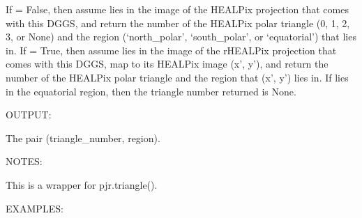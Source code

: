 \documentclass[a4paper,12ptopenany,oneside,english]{sphinxmanual}
\begin{document}
\begin{fulllineitems}
\begin{fulllineitems}
\label{\detokenize{dggs:rhealpixdggs.dggs.RHEALPixDGGS.triangle}}
\pysigstartsignatures
\pysiglinewithargsret
{}
{\sphinxparamcomma {}\sphinxparamcomma {}}
{}
\pysigstopsignatures
\sphinxAtStartPar
If  = False, then assume  lies in the image of the
HEALPix projection that comes with this DGGS, and
return the number of the HEALPix polar triangle (0, 1, 2, 3, or None)
and the region (‘north\_polar’, ‘south\_polar’, or ‘equatorial’) that
 lies in.
If  = True, then assume  lies in the image of
the rHEALPix projection that comes with this DGGS, map 
to its HEALPix image (x’, y’), and return the number of the HEALPix
polar triangle and the region that (x’, y’) lies in.
If  lies in the equatorial region, then the triangle number
returned is None.

\sphinxAtStartPar
OUTPUT:

\sphinxAtStartPar
The pair (triangle\_number, region).

\sphinxAtStartPar
NOTES:

\sphinxAtStartPar
This is a wrapper for pjr.triangle().

\sphinxAtStartPar
EXAMPLES:

\begin{sphinxVerbatim}[commandchars=\\\{\}]
  
  \PYG{p}{[} \PYG{p}{]}
 

  \PYG{p}{[} \PYG{p}{]}
 


\end{sphinxVerbatim}
\end{fulllineitems}
\end{fulllineitems}
\end{document}
